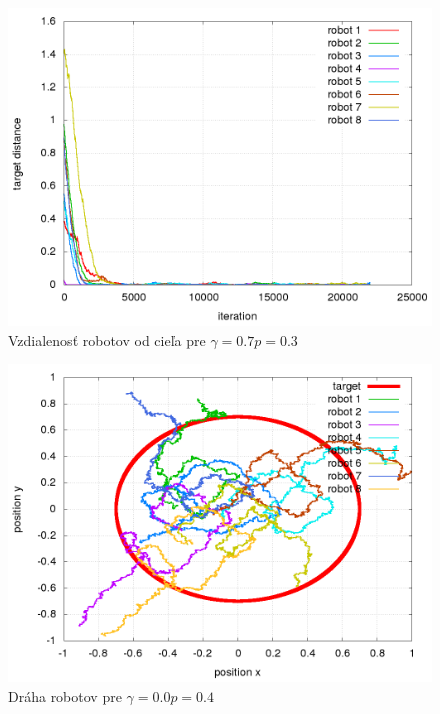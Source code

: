 \begin{figure}[!htb]
\centering
\includegraphics[scale=.4]{../../results_q_learning/nano_q_learning/result_03/robot_reward.png}
\caption{Vzdialenosť robotov od cieľa pre $\gamma = 0.7 p = 0.3$}
\label{img:nano_q_result_03_error}
\end{figure}



\begin{figure}[!htb]
\centering
\includegraphics[scale=.4]{../../results_q_learning/nano_q_learning/result_04_01/robot_path.png}
\caption{Dráha robotov pre $\gamma = 0.0 p = 0.4$}
\label{img:nano_q_result_04_1_path}
\end{figure}

